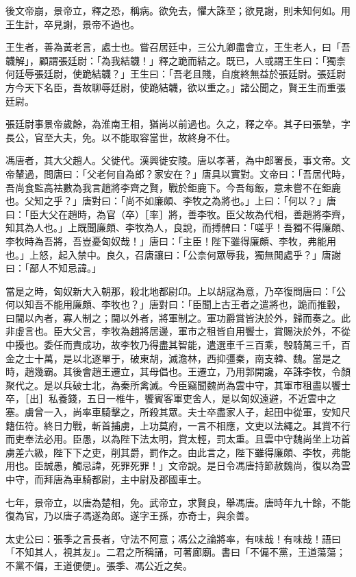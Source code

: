 \begin{pinyinscope}
後文帝崩，景帝立，釋之恐，稱病。欲免去，懼大誅至；欲見謝，則未知何如。用王生計，卒見謝，景帝不過也。

王生者，善為黃老言，處士也。嘗召居廷中，三公九卿盡會立，王生老人，曰「吾韤解」，顧謂張廷尉：「為我結韤！」釋之跪而結之。既已，人或謂王生曰：「獨柰何廷辱張廷尉，使跪結韤？」王生曰：「吾老且賤，自度終無益於張廷尉。張廷尉方今天下名臣，吾故聊辱廷尉，使跪結韤，欲以重之。」諸公聞之，賢王生而重張廷尉。

張廷尉事景帝歲餘，為淮南王相，猶尚以前過也。久之，釋之卒。其子曰張摯，字長公，官至大夫，免。以不能取容當世，故終身不仕。

馮唐者，其大父趙人。父徙代。漢興徙安陵。唐以孝著，為中郎署長，事文帝。文帝輦過，問唐曰：「父老何自為郎？家安在？」唐具以實對。文帝曰：「吾居代時，吾尚食監高袪數為我言趙將李齊之賢，戰於鉅鹿下。今吾每飯，意未嘗不在鉅鹿也。父知之乎？」唐對曰：「尚不如廉頗、李牧之為將也。」上曰：「何以？」唐曰：「臣大父在趙時，為官（卒）［率］將，善李牧。臣父故為代相，善趙將李齊，知其為人也。」上既聞廉頗、李牧為人，良說，而搏髀曰：「嗟乎！吾獨不得廉頗、李牧時為吾將，吾豈憂匈奴哉！」唐曰：「主臣！陛下雖得廉頗、李牧，弗能用也。」上怒，起入禁中。良久，召唐讓曰：「公柰何眾辱我，獨無閒處乎？」唐謝曰：「鄙人不知忌諱。」

當是之時，匈奴新大入朝那，殺北地都尉卬。上以胡寇為意，乃卒復問唐曰：「公何以知吾不能用廉頗、李牧也？」唐對曰：「臣聞上古王者之遣將也，跪而推轂，曰閫以內者，寡人制之；閫以外者，將軍制之。軍功爵賞皆決於外，歸而奏之。此非虛言也。臣大父言，李牧為趙將居邊，軍市之租皆自用饗士，賞賜決於外，不從中擾也。委任而責成功，故李牧乃得盡其智能，遣選車千三百乘，彀騎萬三千，百金之士十萬，是以北逐單于，破東胡，滅澹林，西抑彊秦，南支韓、魏。當是之時，趙幾霸。其後會趙王遷立，其母倡也。王遷立，乃用郭開讒，卒誅李牧，令顏聚代之。是以兵破士北，為秦所禽滅。今臣竊聞魏尚為雲中守，其軍市租盡以饗士卒，［出］私養錢，五日一椎牛，饗賓客軍吏舍人，是以匈奴遠避，不近雲中之塞。虜曾一入，尚率車騎擊之，所殺其眾。夫士卒盡家人子，起田中從軍，安知尺籍伍符。終日力戰，斬首捕虜，上功莫府，一言不相應，文吏以法繩之。其賞不行而吏奉法必用。臣愚，以為陛下法太明，賞太輕，罰太重。且雲中守魏尚坐上功首虜差六級，陛下下之吏，削其爵，罰作之。由此言之，陛下雖得廉頗、李牧，弗能用也。臣誠愚，觸忌諱，死罪死罪！」文帝說。是日令馮唐持節赦魏尚，復以為雲中守，而拜唐為車騎都尉，主中尉及郡國車士。

七年，景帝立，以唐為楚相，免。武帝立，求賢良，舉馮唐。唐時年九十餘，不能復為官，乃以唐子馮遂為郎。遂字王孫，亦奇士，與余善。

太史公曰：張季之言長者，守法不阿意；馮公之論將率，有味哉！有味哉！語曰「不知其人，視其友」。二君之所稱誦，可著廊廟。書曰「不偏不黨，王道蕩蕩；不黨不偏，王道便便」。張季、馮公近之矣。


\end{pinyinscope}